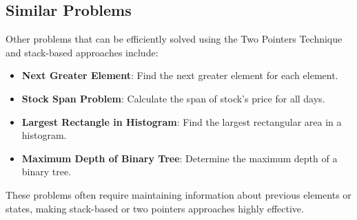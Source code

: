 \subsection*{Similar Problems}
Other problems that can be efficiently solved using the Two Pointers Technique and stack-based approaches include:
\begin{itemize}
    \item \textbf{Next Greater Element}: Find the next greater element for each element.
    \item \textbf{Stock Span Problem}: Calculate the span of stock's price for all days.
    \item \textbf{Largest Rectangle in Histogram}: Find the largest rectangular area in a histogram.
    \item \textbf{Maximum Depth of Binary Tree}: Determine the maximum depth of a binary tree.
\end{itemize}
These problems often require maintaining information about previous elements or states, making stack-based or two pointers approaches highly effective.


